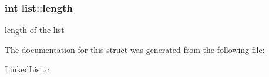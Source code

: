 \subsubsection[{length}]{\setlength{\rightskip}{0pt plus 5cm}int list\+::length}\label{structlist_a26fae59927b62854e7b46a5e422f4f3f}
length of the list 

The documentation for this struct was generated from the following file\+:\begin{DoxyCompactItemize}
\item 
Linked\+List.\+c\end{DoxyCompactItemize}
